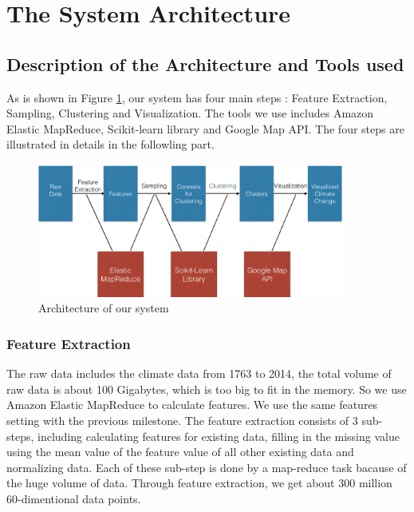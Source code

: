 \section{The System Architecture}

\subsection{Description of the Architecture and Tools used}
As is shown in Figure \ref{fig:archi}, our system has four main steps : Feature Extraction, Sampling, Clustering and Visualization. The tools we use includes Amazon Elastic MapReduce, Scikit-learn library and Google Map API. The four steps are illustrated in details in the followling part.
\begin{figure}[htbp]
				\centering
				\includegraphics[width=0.9\textwidth]{figure/architecture.png}
				\caption{Architecture of our system}
				\label{fig:archi}
 \end{figure}
 
\subsubsection{Feature Extraction}
The raw data includes the climate data from 1763 to 2014, the total volume of raw data is about 100 Gigabytes, which is too big to fit in the memory. So we use Amazon Elastic MapReduce to calculate features. We use the same features setting with the previous milestone. The feature extraction consists of 3 sub-steps, including calculating features for existing data, filling in the missing value using the mean value of the feature value of all other existing data and normalizing data. Each of these sub-step is done by a map-reduce task bacause of the huge volume of data. Through feature extraction, we get about 300 million 60-dimentional data points.

